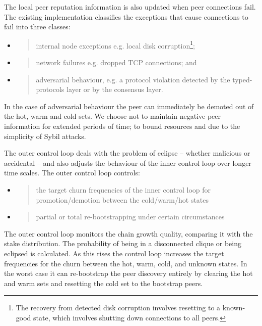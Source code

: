 \documentclass[11pt,a4paper]{article}
\begin{document}
The local peer reputation information is also updated when peer
connections fail. The existing implementation classifies the exceptions
that cause connections to fail into three classes:

\begin{itemize}
\item
  \begin{quote}
  internal node exceptions e.g. local disk corruption\footnote{The
    recovery from detected disk corruption involves resetting to a
    known-good state, which involves shutting down connections to all
    peers.};
  \end{quote}
\item
  \begin{quote}
  network failures e.g. dropped TCP connections; and
  \end{quote}
\item
  \begin{quote}
  adversarial behaviour, e.g. a protocol violation detected by the
  typed-protocols layer or by the consensus layer.
  \end{quote}
\end{itemize}

In the case of adversarial behaviour the peer can immediately be demoted
out of the hot, warm and cold sets. We choose not to maintain negative
peer information for extended periods of time; to bound resources and
due to the simplicity of Sybil attacks.

The outer control loop deals with the problem of eclipse -- whether
malicious or accidental -- and also adjusts the behaviour of the inner
control loop over longer time scales. The outer control loop controls:

\begin{itemize}
\item
  \begin{quote}
  the target churn frequencies of the inner control loop for
  promotion/demotion between the cold/warm/hot states
  \end{quote}
\item
  \begin{quote}
  partial or total re-bootstrapping under certain circumstances
  \end{quote}
\end{itemize}

The outer control loop monitors the chain growth quality, comparing it
with the stake distribution. The probability of being in a disconnected
clique or being eclipsed is calculated. As this rises the control loop
increases the target frequencies for the churn between the hot, warm,
cold, and unknown states. In the worst case it can re-bootstrap the peer
discovery entirely by clearing the hot and warm sets and resetting the
cold set to the bootstrap peers.
\end{document}
